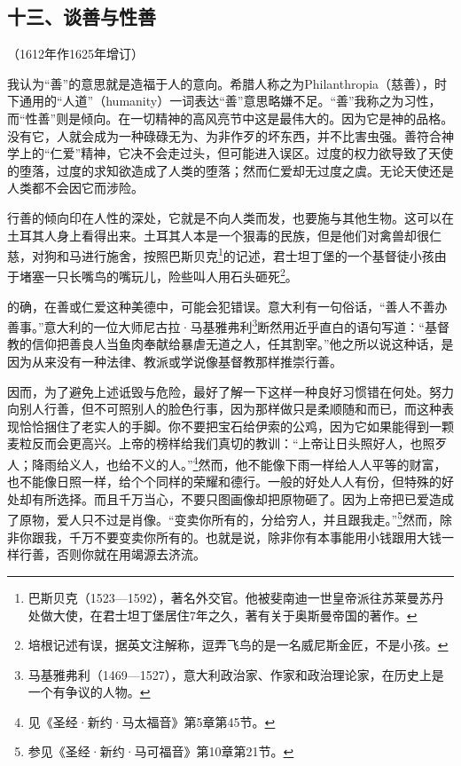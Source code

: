 \subsection*{十三、谈善与性善}

\begin{center}
    （1612年作1625年增订）
\end{center}
\par 我认为“善”的意思就是造福于人的意向。希腊人称之为Philanthropia（慈善），时下通用的“人道”（humanity）一词表达“善”意思略嫌不足。“善”我称之为习性，而“性善”则是倾向。在一切精神的高风亮节中这是最伟大的。因为它是神的品格。没有它，人就会成为一种碌碌无为、为非作歹的坏东西，并不比害虫强。善符合神学上的“仁爱”精神，它决不会走过头，但可能进入误区。过度的权力欲导致了天使的堕落，过度的求知欲造成了人类的堕落；然而仁爱却无过度之虞。无论天使还是人类都不会因它而涉险。
\par 行善的倾向印在人性的深处，它就是不向人类而发，也要施与其他生物。这可以在土耳其人身上看得出来。土耳其人本是一个狠毒的民族，但是他们对禽兽却很仁慈，对狗和马进行施舍，按照巴斯贝克\footnote{巴斯贝克（1523—1592），著名外交官。他被斐南迪一世皇帝派往苏莱曼苏丹处做大使，在君士坦丁堡居住7年之久，著有关于奥斯曼帝国的著作。}的记述，君士坦丁堡的一个基督徒小孩由于堵塞一只长嘴鸟的嘴玩儿，险些叫人用石头砸死\footnote{培根记述有误，据英文注解称，逗弄飞鸟的是一名威尼斯金匠，不是小孩。}。
\par 的确，在善或仁爱这种美德中，可能会犯错误。意大利有一句俗话，“善人不善办善事。”意大利的一位大师尼古拉·马基雅弗利\footnote{马基雅弗利（1469—1527），意大利政治家、作家和政治理论家，在历史上是一个有争议的人物。}断然用近乎直白的语句写道：“基督教的信仰把善良人当鱼肉奉献给暴虐无道之人，任其割宰。”他之所以说这种话，是因为从来没有一种法律、教派或学说像基督教那样推崇行善。
\par 因而，为了避免上述诋毁与危险，最好了解一下这样一种良好习惯错在何处。努力向别人行善，但不可照别人的脸色行事，因为那样做只是柔顺随和而已，而这种表现恰恰捆住了老实人的手脚。你不要把宝石给伊索的公鸡，因为它如果能得到一颗麦粒反而会更高兴。上帝的榜样给我们真切的教训：“上帝让日头照好人，也照歹人；降雨给义人，也给不义的人。”\footnote{见《圣经·新约·马太福音》第5章第45节。}然而，他不能像下雨一样给人人平等的财富，也不能像日照一样，给个个同样的荣耀和德行。一般的好处人人有份，但特殊的好处却有所选择。而且千万当心，不要只图画像却把原物砸了。因为上帝把已爱造成了原物，爱人只不过是肖像。“变卖你所有的，分给穷人，并且跟我走。”\footnote{参见《圣经·新约·马可福音》第10章第21节。}然而，除非你跟我，千万不要变卖你所有的。也就是说，除非你有本事能用小钱跟用大钱一样行善，否则你就在用竭源去济流。
